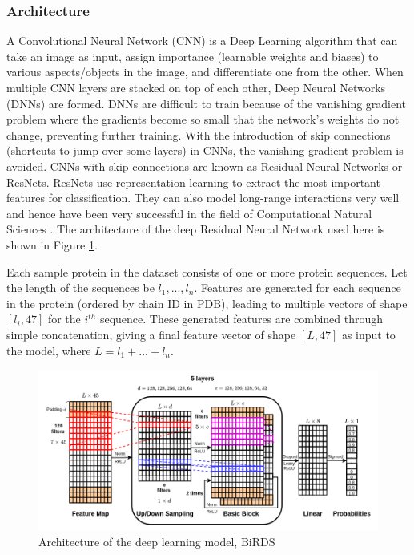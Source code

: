 \documentclass[journal=jacsat,manuscript=article]{achemso}
\begin{document}
\subsubsection{Architecture}
\quad A Convolutional Neural Network (CNN) is a Deep Learning algorithm that can take an image as input, assign importance (learnable weights and biases) to various aspects/objects in the image, and differentiate one from the other. When multiple CNN layers are stacked on top of each other, Deep Neural Networks (DNNs) are formed. DNNs are difficult to train because of the vanishing gradient problem where the gradients become so small that the network's weights do not change, preventing further training. With the introduction of skip connections (shortcuts to jump over some layers) in CNNs, the vanishing gradient problem is avoided. CNNs with skip connections are known as Residual Neural Networks or ResNets. ResNets use representation learning to extract the most important features for classification. They can also model long-range interactions very well and hence have been very successful in the field of Computational Natural Sciences \cite{senior2020improved}.  The architecture of the deep Residual Neural Network used here is shown in Figure \ref{fig:architecture}.

Each sample protein in the dataset consists of one or more protein sequences. Let the length of the sequences be $l_1, ..., l_n$. Features are generated for each sequence in the protein (ordered by chain ID in PDB), leading to multiple vectors of shape $[l_i, 47]$ for the $i^{th}$ sequence. These generated features are combined through simple concatenation, giving a final feature vector of shape $[L, 47]$ as input to the model, where $L = l_1 + ... + l_n$.

\begin{figure}
    \centering
    \noindent\includegraphics[scale=0.5]{architecture}
    \caption{\centering Architecture of the deep learning model, BiRDS}
    \label{fig:architecture}
\end{figure}
\end{document}
